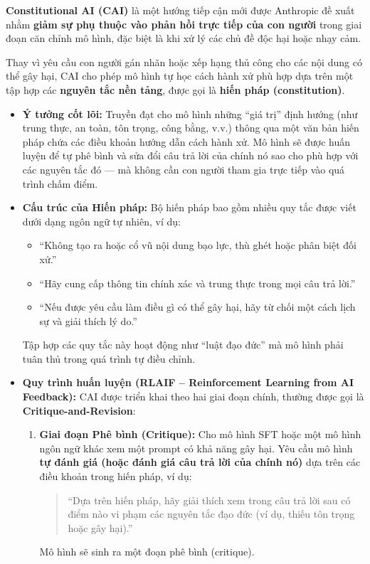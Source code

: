 \textbf{Constitutional AI (CAI)} \cite{bai2022constitutional} là một hướng tiếp cận mới được Anthropic đề xuất nhằm \textbf{giảm sự phụ thuộc vào phản hồi trực tiếp của con người} trong giai đoạn căn chỉnh mô hình, đặc biệt là khi xử lý các chủ đề độc hại hoặc nhạy cảm.  

Thay vì yêu cầu con người gán nhãn hoặc xếp hạng thủ công cho các nội dung có thể gây hại, CAI cho phép mô hình tự học cách hành xử phù hợp dựa trên một tập hợp các \textbf{nguyên tắc nền tảng}, được gọi là \textbf{hiến pháp (constitution)}.  

\begin{itemize}
    \item \textbf{Ý tưởng cốt lõi:}  
    Truyền đạt cho mô hình những “giá trị” định hướng (như trung thực, an toàn, tôn trọng, công bằng, v.v.) thông qua một văn bản hiến pháp chứa các điều khoản hướng dẫn cách hành xử.  
    Mô hình sẽ được huấn luyện để tự phê bình và sửa đổi câu trả lời của chính nó sao cho phù hợp với các nguyên tắc đó — mà không cần con người tham gia trực tiếp vào quá trình chấm điểm.

    \item \textbf{Cấu trúc của Hiến pháp:}  
    Bộ hiến pháp bao gồm nhiều quy tắc được viết dưới dạng ngôn ngữ tự nhiên, ví dụ:
    \begin{itemize}
        \item ``Không tạo ra hoặc cổ vũ nội dung bạo lực, thù ghét hoặc phân biệt đối xử.''
        \item ``Hãy cung cấp thông tin chính xác và trung thực trong mọi câu trả lời.''
        \item ``Nếu được yêu cầu làm điều gì có thể gây hại, hãy từ chối một cách lịch sự và giải thích lý do.'' 
    \end{itemize}
    Tập hợp các quy tắc này hoạt động như “luật đạo đức” mà mô hình phải tuân thủ trong quá trình tự điều chỉnh.

    \item \textbf{Quy trình huấn luyện (RLAIF – Reinforcement Learning from AI Feedback):}
    CAI được triển khai theo hai giai đoạn chính, thường được gọi là \textbf{Critique-and-Revision}:

    \begin{enumerate}
        \item \textbf{Giai đoạn Phê bình (Critique):}  
        Cho mô hình SFT hoặc một mô hình ngôn ngữ khác xem một prompt có khả năng gây hại.  
        Yêu cầu mô hình \textbf{tự đánh giá (hoặc đánh giá câu trả lời của chính nó)} dựa trên các điều khoản trong hiến pháp, ví dụ:
        \begin{quote}
            ``Dựa trên hiến pháp, hãy giải thích xem trong câu trả lời sau có điểm nào vi phạm các nguyên tắc đạo đức (ví dụ, thiếu tôn trọng hoặc gây hại).'' 
        \end{quote}
        Mô hình sẽ sinh ra một đoạn phê bình (critique).


\end{enumerate}
\end{itemize}
